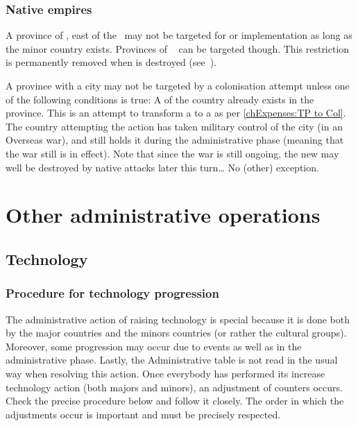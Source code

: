 \subsubsection{Native empires}\label{chExpenses:Native empires}
\aparag[Siberia] A province of \continentSiberia, east of the \Area\
\granderegionSiberie may not be targeted for \TP or \COL implementation as
long as the minor country \paysSiberie exists. Provinces of \Area\
 can be targeted though.
\bparag This restriction is permanently removed when \pays{Siberie} is
destroyed (see~\ruleref{chSpecific:Siberia}).

\aparag[Cities] A province with a city may not be targeted by a colonisation
attempt unless one of the following conditions is true:
\bparag A \COL of the country already exists in the province.
\bparag This is an attempt to transform a \TP to a \COL as per
\ref{chExpenses:TP to Col}.
\bparag The country attempting the action has taken military control of the
city (in an Overseas war), and still holds it during the administrative phase
(meaning that the war still is in effect). Note that since the war is still
ongoing, the new \COL may well be destroyed by native attacks later this
turn\ldots
\bparag No (other) exception.





\section{Other administrative operations}\label{chExpenses:Techno and Competition}



\subsection{Technology}\label{chExpenses:Technology}


\subsubsection{Procedure for technology progression}
\aparag The administrative action of raising technology is special because it
is done both by the major countries and the minors countries (or rather the
cultural groups). Moreover, some progression may occur due to events as well
as in the administrative phase. Lastly, the Administrative table is not read
in the usual way when resolving this action.
\bparag Once everybody has performed its increase technology action (both
majors and minors), an adjustment of counters occurs. Check the precise
procedure below and follow it closely. The order in which the adjustments
occur is important and must be precisely respected.

